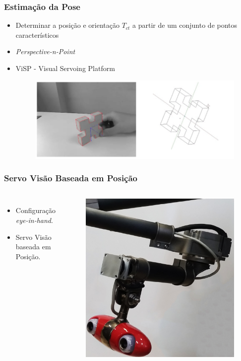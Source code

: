 \documentclass{beamer}
\begin{document}
\begin{frame}
\frametitle{Estimação da Pose}
\begin{itemize}
\item Determinar a posição e orientação ${T}_{ct}$ a partir de um conjunto de pontos característicos
\item \textit{Perspective-n-Point}
\item ViSP - Visual Servoing Platform
\begin{figure}
\includegraphics[width=0.75\linewidth]{./img/visp.png}
\end{figure}
\end{itemize}
\end{frame}

\begin{frame}
\frametitle{Servo Visão Baseada em Posição}
\begin{columns}[c] %

\begin{itemize}
\item Configuração \textit{eye-in-hand}.
\item Servo Visão baseada em Posição.
\end{itemize}

\begin{figure}
\includegraphics[width=0.5\linewidth]{./img/manip_zoom.png}
\end{figure}
\end{columns}
\end{frame}
\end{document}
